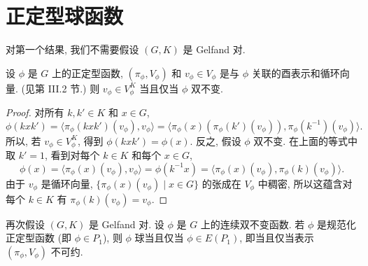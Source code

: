 \section{正定型球函数}
对第一个结果, 我们不需要假设 $(G, K)$ 是 Gelfand 对.

\begin{proposition}[循环向量与双不变性]
\label{prop:V.5.1}
设 $\phi$ 是 $G$ 上的正定型函数, $(\pi_{\phi}, V_{\phi})$ 和 $v_{\phi} \in V_{\phi}$ 是与 $\phi$ 关联的酉表示和循环向量. (见第 III.2 节.)
则 $v_{\phi} \in V_{\phi}^K$ 当且仅当 $\phi$ 双不变.
\end{proposition}

\begin{proof}
对所有 $k, k' \in K$ 和 $x \in G$,
\[
\phi(kxk') = \langle \pi_{\phi}(kxk')(v_{\phi}), v_{\phi} \rangle = \langle \pi_{\phi}(x)(\pi_{\phi}(k')(v_{\phi})), \pi_{\phi}(k^{-1})(v_{\phi}) \rangle.
\]
所以, 若 $v_{\phi} \in V_{\phi}^K$, 得到 $\phi(kxk') = \phi(x)$. 反之, 假设 $\phi$ 双不变. 在上面的等式中取 $k' = 1$, 看到对每个 $k \in K$ 和每个 $x \in G$,
\[
\phi(x) = \langle \pi_{\phi}(x)(v_{\phi}), v_{\phi} \rangle = \phi(k^{-1}x) = \langle \pi_{\phi}(x)(v_{\phi}), \pi_{\phi}(k)(v_{\phi}) \rangle.
\]
由于 $v_{\phi}$ 是循环向量, $\{\pi_{\phi}(x)(v_{\phi}) \mid x \in G\}$ 的张成在 $V_{\phi}$ 中稠密, 所以这蕴含对每个 $k \in K$ 有 $\pi_{\phi}(k)(v_{\phi}) = v_{\phi}$.
\end{proof}

\begin{theorem}
\label{thm:V.5.2}
再次假设 $(G, K)$ 是 Gelfand 对. 设 $\phi$ 是 $G$ 上的连续双不变函数.
若 $\phi$ 是规范化正定型函数 (即 $\phi \in P_1$), 则 $\phi$ 球当且仅当 $\phi \in E(P_1)$, 即当且仅当表示 $(\pi_{\phi}, V_{\phi})$ 不可约.
\end{theorem}

